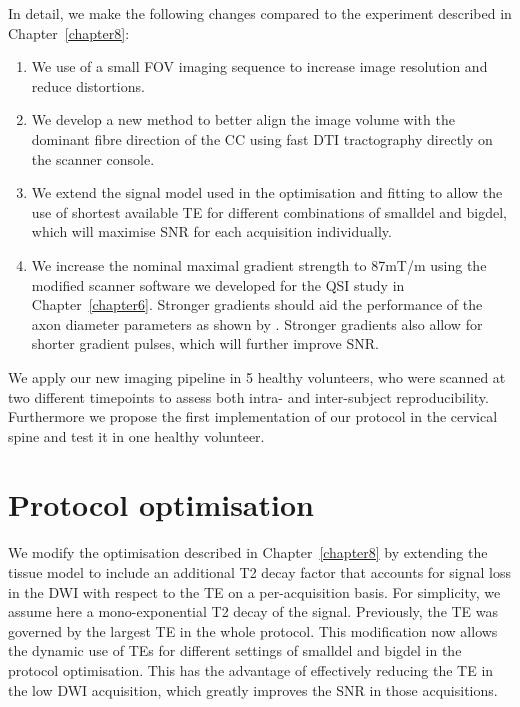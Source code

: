 In detail, we make the following changes compared to the \SFasym{} experiment described in Chapter~\ref{chapter8}:
\begin{enumerate}
\item We use of a small \gls{FOV} imaging sequence to increase image resolution and reduce distortions.
\item We develop a new method to better align the image volume with the dominant fibre direction of the \gls{CC} using fast DTI tractography directly on the scanner console.
\item We extend the signal model used in the optimisation and fitting to allow the use of shortest available \gls{TE} for different combinations of \gls{smalldel} and \gls{bigdel}, which will maximise \gls{SNR} for each acquisition individually.
\item We increase the nominal maximal gradient strength to 87mT/m using the modified scanner software we developed for the QSI study in Chapter~\ref{chapter6}. Stronger gradients should aid the performance of the axon diameter parameters as shown by \citet{Dyrby:2010}. Stronger gradients also allow for shorter gradient pulses, which will further improve \gls{SNR}.
\end{enumerate}
We apply our new imaging pipeline in 5 healthy volunteers, who were scanned at two different timepoints to assess both intra- and inter-subject reproducibility. Furthermore we propose the first implementation of our \SFasym{} protocol in the cervical spine and test it in one healthy volunteer. 


\section{Protocol optimisation}
We modify the \SFasym{} optimisation described in Chapter~\ref{chapter8} by extending the tissue model to include an additional T2 decay factor that accounts for signal loss in the DWI with respect to the \gls{TE} on a per-acquisition basis. For simplicity, we assume here a mono-exponential T2 decay of the signal. Previously, the \gls{TE} was governed by the largest TE in the whole protocol. This modification now allows the dynamic use of \glspl{TE} for different settings of \gls{smalldel} and \gls{bigdel} in the protocol optimisation. This has the advantage of effectively reducing the \gls{TE} in the low DWI acquisition, which greatly improves the \gls{SNR} in those acquisitions.

